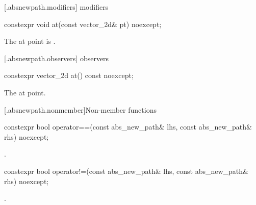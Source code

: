  [\iotwod.absnewpath.modifiers]{ modifiers}%

%
\begin{itemdecl}
constexpr void at(const vector_2d& pt) noexcept;
\end{itemdecl}
\begin{itemdescr}
\pnum
\effects
The at point is .
\end{itemdescr}

 [\iotwod.absnewpath.observers]{ observers}%

%
\begin{itemdecl}
constexpr vector_2d at() const noexcept;
\end{itemdecl}
\begin{itemdescr}
\pnum
\returns
The at point.
\end{itemdescr}

 [\iotwod.absnewpath.nonmember]{Non-member functions}%

%
\begin{itemdecl}
constexpr bool operator==(const abs_new_path& lhs, const abs_new_path& rhs) 
  noexcept;
\end{itemdecl}
\begin{itemdescr}
\pnum
\returns
{}.
\end{itemdescr}

%
\begin{itemdecl}
constexpr bool operator!=(const abs_new_path& lhs, const abs_new_path& rhs) 
  noexcept;
\end{itemdecl}
\begin{itemdescr}
\pnum
\returns
{}.
\end{itemdescr}
